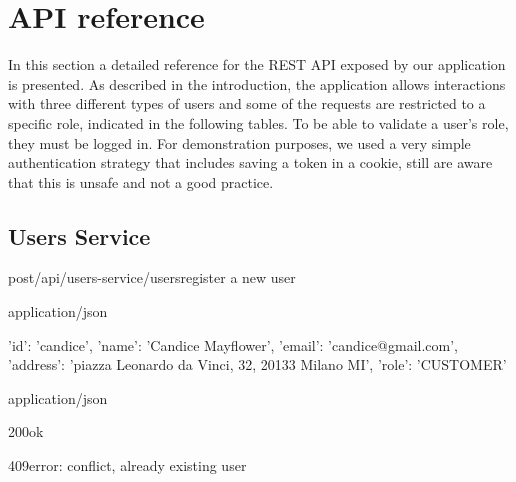 \section{API reference}
\label{sec:api}
In this section a detailed reference for the REST API exposed by our application is presented. As described in the introduction, the application allows interactions with three different types of users and some of the requests are restricted to a specific role, indicated in the following tables. To be able to validate a user's role, they must be logged in. For demonstration purposes, we used a very simple authentication strategy that includes saving a token in a cookie, still are aware that this is unsafe and not a good practice.

\renewcommand{\getGetColor}{getYellow}
\renewcommand{\getGetBorderColor}{getYellowBorder}
\renewcommand{\getGetLightColor}{getLightYellow}

\subsection{Users Service}
\begin{apiRoute}{post}{/api/users-service/users}{register a new user}
	\begin{routeParameter}
	\end{routeParameter}
	\begin{routeRequest}{application/json}
		\begin{routeRequestBody}
{
    'id': 'candice',
    'name': 'Candice Mayflower',
    'email': 'candice@gmail.com',
    'address': 'piazza Leonardo da Vinci, 32, 20133 Milano MI',
    'role': 'CUSTOMER'
}
		\end{routeRequestBody}
	\end{routeRequest}
	\begin{routeResponse}{application/json}
	    \begin{routeResponseItem}{200}{ok}
    		\begin{routeResponseItemBody}
        	\end{routeResponseItemBody} 
	    \end{routeResponseItem}
        \begin{routeResponseItem}{409}{error: conflict, already existing user}
			\begin{routeResponseItemBody}
			\end{routeResponseItemBody}
		\end{routeResponseItem}
	\end{routeResponse}
\end{apiRoute}

